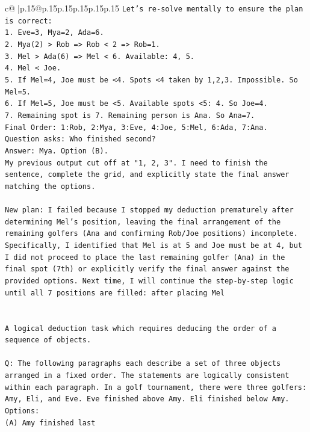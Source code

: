\documentclass{article}
\begin{document}
{\begin{supertabular}{c@{$\;$}|p{.15\linewidth}@{}p{.15\linewidth}p{.15\linewidth}p{.15\linewidth}p{.15\linewidth}p{.15\linewidth}}
{{{\texttt{Let's re{-}solve mentally to ensure the plan is correct:} \\
\texttt{1. Eve=3, Mya=2, Ada=6.} \\
\texttt{2. Mya(2) > Rob => Rob < 2 => Rob=1.} \\
\texttt{3. Mel > Ada(6) => Mel < 6. Available: 4, 5.} \\
\texttt{4. Mel < Joe.} \\
\texttt{5. If Mel=4, Joe must be <4. Spots <4 taken by 1,2,3. Impossible. So Mel=5.} \\
\texttt{6. If Mel=5, Joe must be <5. Available spots <5: 4. So Joe=4.} \\
\texttt{7. Remaining spot is 7. Remaining person is Ana. So Ana=7.} \\
\texttt{Final Order: 1:Rob, 2:Mya, 3:Eve, 4:Joe, 5:Mel, 6:Ada, 7:Ana.} \\
\texttt{Question asks: Who finished second?} \\
\texttt{Answer: Mya. Option (B).} \\
\texttt{My previous output cut off at "1, 2, 3". I need to finish the sentence, complete the grid, and explicitly state the final answer matching the options.} \\
\\ 
\texttt{New plan: I failed because I stopped my deduction prematurely after determining Mel's position, leaving the final arrangement of the remaining golfers (Ana and confirming Rob/Joe positions) incomplete. Specifically, I identified that Mel is at 5 and Joe must be at 4, but I did not proceed to place the last remaining golfer (Ana) in the final spot (7th) or explicitly verify the final answer against the provided options. Next time, I will continue the step{-}by{-}step logic until all 7 positions are filled: after placing Mel} \\
\\ 
\\ 
\texttt{A logical deduction task which requires deducing the order of a sequence of objects.} \\
\\ 
\texttt{Q: The following paragraphs each describe a set of three objects arranged in a fixed order. The statements are logically consistent within each paragraph. In a golf tournament, there were three golfers: Amy, Eli, and Eve. Eve finished above Amy. Eli finished below Amy.} \\
\texttt{Options:} \\
\texttt{(A) Amy finished last} \\
}}}
\end{supertabular}}
\end{document}
